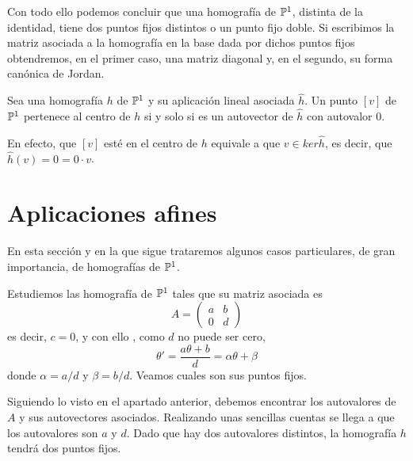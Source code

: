 Con todo ello podemos concluir que una homografía de $\mathbb{P}^1$, distinta de la identidad, tiene dos puntos fijos distintos o un punto fijo doble. Si escribimos la matriz asociada a la homografía en la base dada por dichos puntos fijos obtendremos, en el primer caso, una matriz diagonal y, en el segundo, su forma canónica de Jordan. 
\begin{obs}
	Sea una homografía $h$ de $\mathbb{P}^1$ y su aplicación lineal asociada $\widehat{h}$. Un punto $[v]$ de $\mathbb{P}^1$ pertenece al centro de $h$ si y solo si es un autovector de $\widehat{h}$ con autovalor $0$.
	
	En efecto, que $[v]$ esté en el centro de $h$ equivale a que $v\in ker\widehat{h}$, es decir, que $\widehat{h}(v)=0=0\cdot v$.
\end{obs}

\section{Aplicaciones afines}
En esta sección y en la que sigue trataremos algunos casos particulares, de gran importancia, de homografías de $\mathbb{P}^1$.

Estudiemos las homografía de $\mathbb{P}^1$ tales que su matriz asociada es
\begin{equation*}
	A=\left( \begin{array}{cc}
		a&b\\
		0&d
	\end{array}\right)
\end{equation*}
es decir, $c=0$, y con ello , como $d$ no puede ser cero, 
\begin{equation}
	\theta'=\frac{a\theta+b}{d}=\alpha\theta+\beta
\end{equation}
donde $\alpha=a/d$ y $\beta=b/d$. Veamos cuales son sus puntos fijos.

Siguiendo lo visto en el apartado anterior, debemos encontrar los autovalores de $A$ y sus autovectores asociados. Realizando unas sencillas cuentas se llega a que los autovalores son $a$ y $d$. Dado que hay dos autovalores distintos, la homografía $h$ tendrá dos puntos fijos. 

